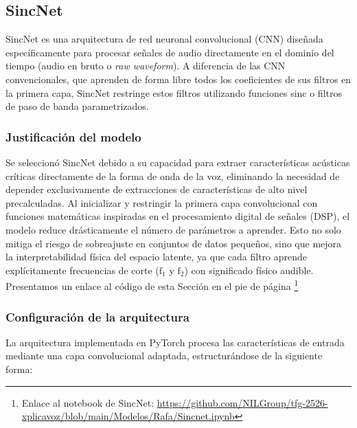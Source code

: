 \subsection{SincNet}
\label{subsubsec:mod_sincnet}

SincNet es una arquitectura de red neuronal convolucional (CNN) diseñada específicamente para procesar señales de audio directamente en el dominio del tiempo (audio en bruto o \textit{raw waveform}). A diferencia de las CNN convencionales, que aprenden de forma libre todos los coeficientes de sus filtros en la primera capa, SincNet restringe estos filtros utilizando funciones sinc o filtros de paso de banda parametrizados.

\subsubsection*{Justificación del modelo}

Se seleccionó SincNet debido a su capacidad para extraer características acústicas críticas directamente de la forma de onda de la voz, eliminando la necesidad de depender exclusivamente de extracciones de características de alto nivel precalculadas. Al inicializar y restringir la primera capa convolucional con funciones matemáticas inspiradas en el procesamiento digital de señales (DSP), el modelo reduce drásticamente el número de parámetros a aprender. Esto no solo mitiga el riesgo de sobreajuste en conjuntos de datos pequeños, sino que mejora la interpretabilidad física del espacio latente, ya que cada filtro aprende explícitamente frecuencias de corte ($\text{f}_1$ y $\text{f}_2$) con significado físico audible. Presentamos un enlace al código de esta Sección en el pie de página \footnote{Enlace al notebook de SincNet: \url{https://github.com/NILGroup/tfg-2526-xplicavoz/blob/main/Modelos/Rafa/Sincnet.ipynb}}

\subsubsection*{Configuración de la arquitectura}

La arquitectura implementada en PyTorch procesa las características de entrada mediante una capa convolucional adaptada, estructurándose de la siguiente forma:

